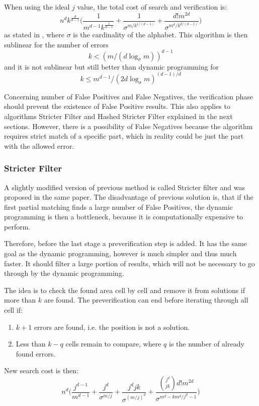 When using the ideal $j$ value, the total cost of search and verification is: $$n^dk^{\frac{d}{d-1}}\Big(\frac{1}{m^{d-1}k^{\frac{1}{d-1}}} + \frac{1}{\sigma^{m/k^{1/(d-1)}}} + \frac{d!m^{2d}}{\sigma^{m^d/k^{d/(d-1)}}}\Big)$$ as stated in \cite{mdApproxPM}, where $\sigma$ is the cardinality of the alphabet. This algorithm is then sublinear for the number of errors $$ k < (m/(d \log_\sigma m))^{d-1} $$ and it is not sublinear but still better than dynamic programming for $$k \leq m^{d-1}/(2d\log_\sigma m)^{(d-1)/d} $$

Concerning number of False Positives and False Negatives, the verification phase should prevent the existence of False Positive results. This also applies to algorithms Stricter Filter and Hashed Stricter Filter explained in the next sections. However, there is a possibility of False Negatives because the algorithm requires strict match of a specific part, which in reality could be just the part with the allowed error.

\subsubsection{Stricter Filter}
A slightly modified version of previous method is called Stricter filter and was proposed in the same paper. The disadvantage of previous solution is, that if the first partial matching finds a large number of False Positives, the dynamic programming is then a bottleneck, because it is computationally expensive to perform.

Therefore, before the last stage a preverification step is added. It has the same goal as the dynamic programming, however is much simpler and thus much faster. It should filter a large portion of results, which will not be necessary to go through by the dynamic programming.

The idea is to check the found area cell by cell and remove it from solutions if more than $k$ are found. The preverification can end before iterating through all cell if:

\begin{enumerate}
\item $k+1$ errors are found, i.e. the position is not a solution.
\item Less than $k - q$ cells remain to compare, where $q$ is the number of already found errors.
\end{enumerate}

New search cost is then: $$ n^d \Big(\frac{j^{d-1}}{m^{d-1}} + \frac{j^d}{\sigma^{m/j}} + \frac{j^djk}{\sigma^{(m/j)^d}} + \frac{{j^d \choose jk} d! m^{2d} }{\sigma^{m^d - km^d/j^d -1}}\Big) $$


